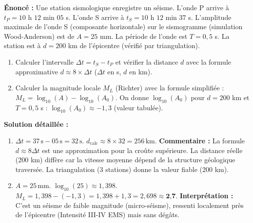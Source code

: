 \documentclass[11pt]{article}
\begin{document}
\begin{exoresolu}
\textbf{Énoncé :} Une station sismologique enregistre un séisme. L'onde P arrive à $t_P = 10$ h $12$ min $05$ s. L'onde S arrive à $t_S = 10$ h $12$ min $37$ s. L'amplitude maximale de l'onde S (composante horizontale) sur le sismogramme (simulation Wood-Anderson) est de $A = 25$ mm. La période de l'onde est $T = 0,5$ s. La station est à $d = 200$ km de l'épicentre (vérifié par triangulation).
\begin{enumerate}
    \item Calculer l'intervalle $\Delta t = t_S - t_P$ et vérifier la distance $d$ avec la formule approximative $d \approx 8 \times \Delta t$ ($\Delta t$ en s, $d$ en km).
    \item Calculer la magnitude locale $M_L$ (Richter) avec la formule simplifiée : $M_L = \log_{10}(A) - \log_{10}(A_0)$.
    On donne $\log_{10}(A_0)$ pour $d=200$ km et $T=0,5$ s : $\log_{10}(A_0) \approx -1,3$ (valeur tabulée).
\end{enumerate}

\tcblower
\textbf{Solution détaillée :}
\begin{enumerate}
    \item $\Delta t = 37\,\text{s} - 05\,\text{s} = 32\,\text{s}$.
    $d_{\text{calc}} \approx 8 \times 32 = 256\,\text{km}$.
    \textbf{Commentaire :} La formule $d \approx 8 \Delta t$ est une approximation pour la croûte supérieure. La distance réelle (200 km) diffère car la vitesse moyenne dépend de la structure géologique traversée. La triangulation (3 stations) donne la valeur fiable (200 km).
    \item $A = 25\,\text{mm}$. $\log_{10}(25) \approx 1,398$.
    $M_L = 1,398 - (-1,3) = 1,398 + 1,3 = 2,698 \approx \textbf{2,7}$.
    \textbf{Interprétation :} C'est un séisme de faible magnitude (micro-séisme), ressenti localement près de l'épicentre (Intensité III-IV EMS) mais sans dégâts.
\end{enumerate}
\end{exoresolu}
\end{document}
